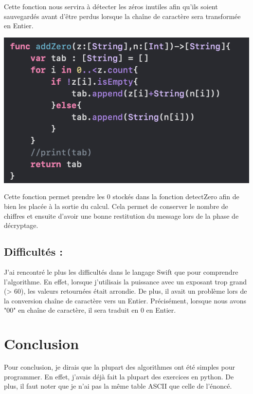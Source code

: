 \documentclass{article}
\begin{document}
Cette fonction nous servira à détecter les zéros inutiles afin qu'ils soient sauvegardés avant d'être perdus lorsque la chaîne de caractère sera transformée en Entier.
\begin{center}
    \includegraphics[scale=0.5]{addZeroRSA.png}
\end{center}
Cette fonction permet prendre les 0 stockés dans la fonction detectZero afin de bien les placée à la sortie du calcul.
Cela permet de conserver le nombre de chiffres et ensuite d'avoir une bonne restitution du message lors de la phase de décryptage.
\subsection{Difficultés :}
J'ai rencontré le plus les difficultés dans le langage Swift que pour comprendre l'algorithme.
En effet, lorsque j'utilisais la puissance avec un exposant trop grand (> 60), les valeurs retournées était arrondie.
De plus, il avait un problème lors de la conversion chaîne de caractère vers un Entier.
Précisément, lorsque nous avons "00" en chaîne de caractère, il sera traduit en 0 en Entier.
\newpage
\section{Conclusion}
Pour conclusion, je dirais que la plupart des algorithmes ont été simples pour programmer.
En effet, j'avais déjà fait la plupart des exercices en python.
De plus, il faut noter que je n'ai pas la même table ASCII que celle de l'énoncé.
\end{document}
